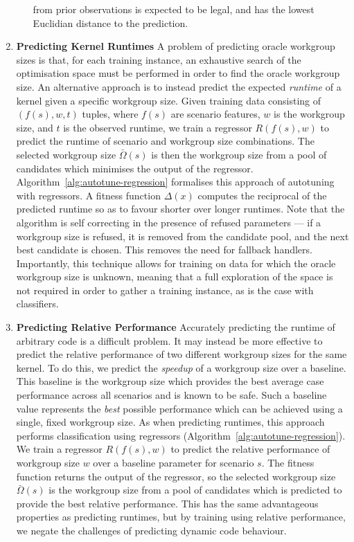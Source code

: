 \documentclass{acaces}
\begin{document}
\begin{enumerate}
\begin{enumerate}
    from prior observations is expected to be legal, and has the lowest
    Euclidian distance to the prediction.
  \end{enumerate}
\item \textbf{Predicting Kernel Runtimes} A problem of predicting
  oracle workgroup sizes is that, for each training instance, an
  exhaustive search of the optimisation space must be performed in
  order to find the oracle workgroup size. An alternative approach is
  to instead predict the expected \emph{runtime} of a kernel given a
  specific workgroup size. Given training data consisting of
  $(f(s),w,t)$ tuples, where $f(s)$ are scenario features, $w$ is the
  workgroup size, and $t$ is the observed runtime, we train a
  regressor $R(f(s), w)$ to predict the runtime of scenario and
  workgroup size combinations. The selected workgroup size
  $\bar{\Omega}(s)$ is then the workgroup size from a pool of
  candidates which minimises the output of the
  regressor. Algorithm~\ref{alg:autotune-regression} formalises this
  approach of autotuning with regressors. A fitness function
  $\Delta(x)$ computes the reciprocal of the predicted runtime so as
  to favour shorter over longer runtimes. Note that the algorithm is
  self correcting in the presence of refused parameters --- if a
  workgroup size is refused, it is removed from the candidate pool,
  and the next best candidate is chosen. This removes the need for
  fallback handlers. Importantly, this technique allows for training
  on data for which the oracle workgroup size is unknown, meaning that
  a full exploration of the space is not required in order to gather a
  training instance, as is the case with classifiers.
\item \textbf{Predicting Relative Performance} Accurately predicting
  the runtime of arbitrary code is a difficult problem. It may instead
  be more effective to predict the relative performance of two
  different workgroup sizes for the same kernel. To do this, we
  predict the \emph{speedup} of a workgroup size over a baseline. This
  baseline is the workgroup size which provides the best average case
  performance across all scenarios and is known to be safe. Such a
  baseline value represents the \emph{best} possible performance which
  can be achieved using a single, fixed workgroup size. As when
  predicting runtimes, this approach performs classification using
  regressors (Algorithm~\ref{alg:autotune-regression}). We train a
  regressor $R(f(s), w)$ to predict the relative performance of
  workgroup size $w$ over a baseline parameter for scenario $s$. The
  fitness function returns the output of the regressor, so the
  selected workgroup size $\bar{\Omega}(s)$ is the workgroup size from
  a pool of candidates which is predicted to provide the best relative
  performance. This has the same advantageous properties as predicting
  runtimes, but by training using relative performance, we negate the
  challenges of predicting dynamic code behaviour.
\end{enumerate}
\end{document}
